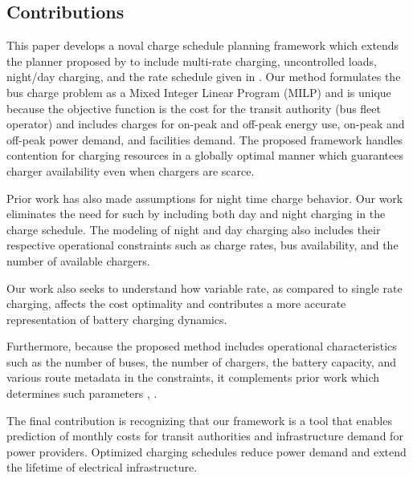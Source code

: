 \subsection{Contributions}
This paper develops a noval charge schedule planning framework which extends the planner proposed by \cite{whitaker_network_2021} to include multi-rate charging, uncontrolled loads, night/day charging, and the rate schedule given in \cite{rocky_mountain_power_rocky_2021}. Our method formulates the bus charge problem as a Mixed Integer Linear Program (MILP) and is unique because the objective function is the cost for the transit authority (bus fleet operator) and includes charges for on-peak and off-peak energy use, on-peak and off-peak power demand, and facilities demand. The proposed framework handles contention for charging resources in a globally optimal manner which guarantees charger availability even when chargers are scarce.
\par Prior work has also made assumptions for night time charge behavior. Our work eliminates the need for such by including both day and night charging in the charge schedule. The modeling of night and day charging also includes their respective operational constraints such as charge rates, bus availability, and the number of available chargers.
\par Our work also seeks to understand how variable rate, as compared to single rate charging, affects the cost optimality and contributes a more accurate representation of battery charging dynamics. 
\par Furthermore, because the proposed method includes operational characteristics such as the number of buses, the number of chargers, the battery capacity, and various route metadata in the constraints, it complements prior work which determines such parameters \cite{taweel_2020_Integrated}, \cite{taweel_2022_Systematic}.
\par The final contribution is recognizing that our framework is a tool that enables prediction of monthly costs for transit authorities and infrastructure demand for power providers.  Optimized charging schedules reduce power demand and extend the lifetime of electrical infrastructure.

